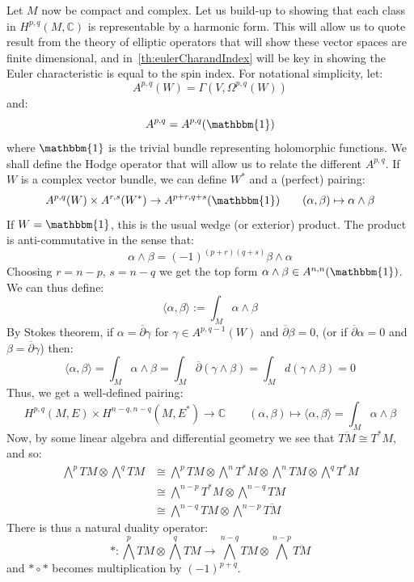 \documentclass{ut-thesis}
\newcommand{\C}{{\mathbb{C}}}
\begin{document}
Let $M$ now be compact and complex. Let us build-up to showing that each class in $H^{p,q}(M, \C)$ is
representable by a harmonic form. This will allow us to quote result from the theory of elliptic operators
that will show these vector spaces are finite dimensional, and in~\cref{th:eulerCharandIndex} will be key in
showing the Euler characteristic is equal to the spin index. For notational simplicity, let:
\[
  A^{p,q}(W) = \Gamma(V, \Omega^{p,q}(W))
\]
and:
\[
  A^{p,q} = A^{p,q}(\mathbbm{1})
\]
where $\mathbbm{1}$ is the trivial bundle representing holomorphic functions. We shall define the Hodge
operator that will allow us to relate the different $A^{p,q}$. If $W$ is a complex vector bundle, we can define $W^*$ and a (perfect) pairing:
\[
  A^{p,q}(W) \times A^{r,s}(W^*) \to A^{p+r, q+s}(\mathbbm{1}) \qquad (\alpha,\beta) \mapsto \alpha\wedge
\beta
\]
If $W = \mathbbm{1}$, this is the usual wedge (or exterior) product. The product is anti-commutative in the
sense that:
\[
  \alpha \wedge \beta = (-1)^{(p+r)(q+s)} \beta \wedge  \alpha
\]
Choosing $r = n-p$, $s = n-q$ we get the top form $\alpha \wedge  \beta \in A^{n,n}(\mathbbm{1})$. We can
thus define:
\[
  \langle \alpha,\beta \rangle := \int_M \alpha \wedge \beta
\]
By Stokes theorem, if $\alpha = \overline{\partial}\gamma$ for $\gamma \in A^{p, q-1}(W)$ and
$\overline{\partial}\beta = 0$, (or if $\overline{\partial}\alpha = 0$ and $\beta
= \overline{\partial}\gamma$) then:
\[
  \langle \alpha,\beta \rangle = \int_M \alpha \wedge \beta = \int_M \overline{\partial}(\gamma \wedge \beta)
  = \int_M d \left(\gamma \wedge  \beta\right) = 0
\]
Thus, we get a well-defined pairing:
\[
  H^{p,q}(M,E) \times H^{n-q, n-q}(M, E^*) \to \C\qquad (\alpha, \beta) \mapsto \langle \alpha,\beta \rangle
  = \int_M \alpha \wedge  \beta
\]
Now, by some linear algebra and differential geometry we see that $\overline{TM} \cong T^*M$, and so:
\begin{align*}
\bigwedge^p TM \otimes \bigwedge^q TM &\cong \bigwedge^p TM \otimes \bigwedge^n T^*M \otimes \bigwedge^n TM \otimes \bigwedge^q T^*M \\
&\cong \bigwedge^{n-p} T^*M \otimes \bigwedge^{n-q} TM \\
&\cong \bigwedge^{n-q} TM \otimes \bigwedge^{n-p} \overline{TM}
\end{align*}
There is thus a natural duality operator:
\[
  *: \bigwedge^p TM \otimes \bigwedge^q TM \to \bigwedge^{n-q} TM \otimes \bigwedge^{n-p} \overline{TM}
\]
and $*\circ *$ becomes multiplication by $(-1)^{p+q}$.
\end{document}
